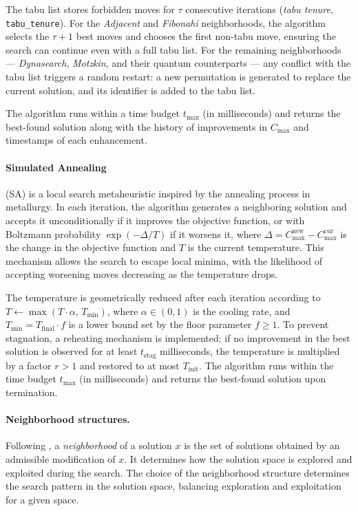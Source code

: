 \documentclass[10pt,twoside,twocolumn,a4paper]{article}
\begin{document}
The tabu list stores forbidden moves for $\tau$ consecutive iterations (\emph{tabu tenure}, \texttt{tabu\_tenure}). For the \emph{Adjacent} and \emph{Fibonahi} neighborhoods, the algorithm selects the $\tau + 1$ best moves and chooses the first non-tabu move, ensuring the search can continue even with a full tabu list. For the remaining neighborhoods — \emph{Dynasearch}, \emph{Motzkin}, and their quantum counterparts — any conflict with the tabu list triggers a random restart: a new permutation is generated to replace the current solution, and its identifier is added to the tabu list.

The algorithm runs within a time budget $t_{\max}$ (in milliseconds) and returns the best-found solution along with the history of improvements in $C_{\max}$ and timestamps of each enhancement.


\paragraph{Simulated Annealing} (SA) is a local search metaheuristic inspired by the annealing process in metallurgy. In each iteration, the algorithm generates a neighboring solution and accepts it unconditionally if it improves the objective function, or with Boltzmann probability $\exp(-\Delta/T)$ if it worsens it, where $\Delta = C_{\max}^{\text{new}} - C_{\max}^{\text{cur}}$ is the change in the objective function and $T$ is the current temperature. This mechanism allows the search to escape local minima, with the likelihood of accepting worsening moves decreasing as the temperature drops.

The temperature is geometrically reduced after each iteration according to $T \leftarrow \max(T \cdot \alpha,\, T_{\min})$, where $\alpha \in (0,1)$ is the cooling rate, and $T_{\min} = T_{\text{final}} \cdot f$ is a lower bound set by the floor parameter $f \ge 1$. To prevent stagnation, a reheating mechanism is implemented: if no improvement in the best solution is observed for at least $t_{\text{stag}}$ milliseconds, the temperature is multiplied by a factor $r > 1$ and restored to at most $T_{\text{init}}$. The algorithm runs within the time budget $t_{\max}$ (in milliseconds) and returns the best-found solution upon termination.



\paragraph{Neighborhood structures.}
Following \cite{vanlaarhoven1992}, a \emph{neighborhood} of a solution $x$ is the set of solutions obtained by an admissible modification of $x$. It determines how the solution space is explored and exploited during the search. The choice of the neighborhood structure determines the search pattern in the solution space, balancing exploration and exploitation for a given space.
\end{document}
